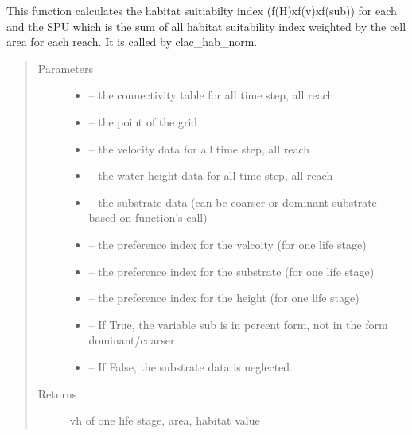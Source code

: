 \documentclass[letterpaper,10pt,english]{sphinxmanual}
\begin{document}

\begin{fulllineitems}
\label{\detokenize{index:src.calcul_hab.calc_hab_norm}}
This function calculates the habitat suitiabilty index (f(H)xf(v)xf(sub)) for each and the SPU which is the sum of
all habitat suitability index weighted by the cell area for each reach. It is called by clac\_hab\_norm.
\begin{quote}\begin{description}
\item[{Parameters}] \leavevmode\begin{itemize}
\item {} 
 -- the connectivity table for all time step, all reach

\item {} 
 -- the point of the grid

\item {} 
 -- the velocity data for all time step, all reach

\item {} 
 -- the water height data for all time step, all reach

\item {} 
 -- the substrate data (can be coarser or dominant substrate based on function's call)

\item {} 
 -- the preference index for the velcoity (for one life stage)

\item {} 
 -- the preference index for the substrate  (for one life stage)

\item {} 
 -- the preference index for the height  (for one life stage)

\item {} 
 -- If True, the variable sub is in percent form, not in the form dominant/coarser

\item {} 
 -- If False, the substrate data is neglected.

\end{itemize}

\item[{Returns}] \leavevmode
vh of one life stage, area, habitat value

\end{description}\end{quote}

\end{fulllineitems}
\end{document}
